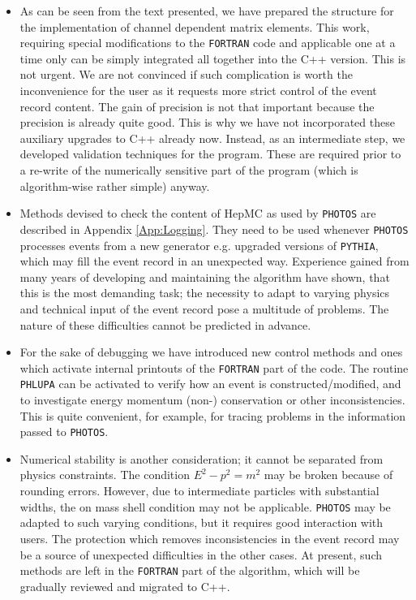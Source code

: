 \documentclass[]{Photos_interface_design}
\begin{document}
\begin{itemize}


\item
As can be seen from the text presented, we have prepared the structure 
for the implementation of channel dependent matrix elements. This work, requiring
special modifications to the {\tt FORTRAN} code and  applicable one at a time only can  
be simply integrated all together into the C++ version. This is not urgent.
 We are  not convinced if such complication is worth 
the inconvenience for the user as it requests more strict control of the event 
record content. The gain of precision is 
not that important because the precision is already quite good. 
This is why we have not incorporated  these auxiliary upgrades to C++ already now.
Instead, as an intermediate step, we developed validation techniques
for the program. These are required prior to a re-write of the
numerically sensitive part of the program (which is algorithm-wise
rather simple) anyway.

\item
Methods devised to check the content of HepMC as used by {\tt PHOTOS} are
described in Appendix \ref{App:Logging}. 
They need to be used whenever {\tt PHOTOS} 
processes events from a new generator e.g. upgraded versions of  {\tt PYTHIA},
which may fill the event record in an unexpected way.
Experience gained from many years of developing and maintaining the algorithm
have shown, that this is the most demanding task; the necessity to
adapt to varying physics and technical input of the event record pose
a multitude of problems. The nature of these difficulties cannot be
predicted in advance. 

\item
For the sake of debugging we have introduced new control methods 
and ones which activate
internal printouts of the {\tt FORTRAN} part of the code.
The routine {\tt PHLUPA} \cite{Barberio:1993qi} can be activated  to verify 
how an event is constructed/modified, and to investigate energy 
momentum (non-) conservation or other inconsistencies.
This is quite convenient, for example, for tracing problems in the
information passed to {\tt PHOTOS}.


\item
Numerical stability is another consideration; it cannot be separated from
physics constraints. The condition  $E^2-p^2=m^2$ may be broken  because of 
rounding errors.  However, due to intermediate particles with
  substantial widths, the on mass shell condition may not be applicable.
{\tt PHOTOS} may be adapted to such varying conditions, but it requires
good interaction with users. The protection which removes 
inconsistencies in the event record may be a source of unexpected difficulties
in the other cases. 
At present, such methods are left in the {\tt FORTRAN} part of the algorithm, 
which
will be gradually reviewed and  migrated to C++.
\end{itemize}
\end{document}
